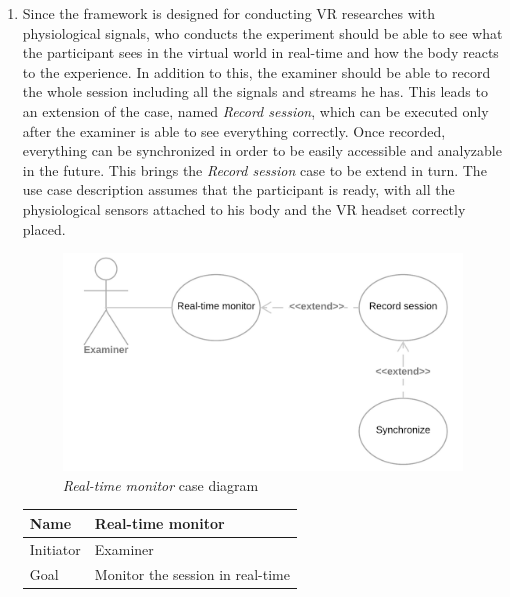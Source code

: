 \documentclass[binding=0.6cm,LaM]{sapthesis}
\begin{document}
\begin{enumerate}

\item Since the framework is designed for conducting VR researches with physiological signals, who conducts the experiment should be able to see what the participant sees in the virtual world in real-time and how the body reacts to the experience. 
In addition to this, the examiner should be able to record the whole session including all the signals and streams he has. This leads to an extension of the case, named \textit{Record session}, which can be executed only after the examiner is able to see everything correctly.
Once recorded, everything can be synchronized in order to be easily accessible and analyzable in the future. This brings the \textit{Record session} case to be extend in turn. 
The use case description assumes that the participant is ready, with all the physiological sensors attached to his body and the VR headset correctly placed.

\begin{figure}[h]
\centering
\includegraphics[scale=.24]{images/use_case_1}
\caption{\textit{Real-time monitor} case diagram}
\end{figure}

\begin{center}
\begin{tabular}{| l | l |}
  \hline			
  Name & Real-time monitor \\
  \hline
  Initiator & Examiner \\
  \hline
  Goal & Monitor the session in real-time \\
  \hline  
\end{tabular}

\vspace{.5cm}


\end{center}
\end{enumerate}
\end{document}
